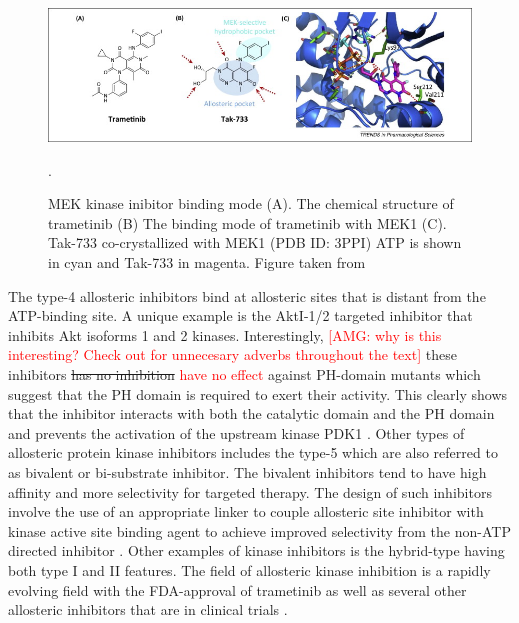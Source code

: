 \documentclass[a4paper, 11pt]{article}
\newcommand{\redcomment}[1]{\textcolor{red}{[#1]}} %
\newcommand{\redinsert}[1]{\textcolor{red}{#1}} %
\begin{document}
\begin{figure}[H]
	\includegraphics[width=\linewidth]{figures/trametinib.jpg}
	\centering
	\caption{MEK kinase inibitor binding mode (A). The chemical structure of trametinib (B) The binding mode of trametinib with MEK1 (C). Tak-733 co-crystallized with MEK1 (PDB ID: 3PPI) ATP is shown in cyan and Tak-733 in magenta. Figure taken from \cite{wu2015fda}}.
	\label{trametinib}
\end{figure}
The type-4 allosteric inhibitors bind at allosteric sites that is distant from the ATP-binding site. A unique example is the AktI-1/2 targeted inhibitor that inhibits Akt isoforms 1 and 2 kinases. Interestingly, \redcomment{AMG: why is this interesting? Check out for unnecesary adverbs throughout the text} 
 these inhibitors \sout{has no inhibition} \redinsert{have no effect} against PH-domain mutants which suggest that the PH domain is required to exert their activity. This clearly shows that the inhibitor interacts with both the catalytic domain and the PH domain and prevents the activation of the upstream kinase PDK1 \cite{barnett2005identification}. Other types of allosteric protein kinase inhibitors includes the type-5 which are also referred to as bivalent or bi-substrate inhibitor. The bivalent inhibitors tend to have high affinity and more selectivity for targeted therapy. The design of such inhibitors involve the use of an appropriate linker to couple allosteric site inhibitor with kinase active site binding agent to achieve improved selectivity from the non-ATP directed inhibitor \cite {lamba2012new}. Other examples of kinase inhibitors is the hybrid-type having both type I and II features. The field of allosteric kinase inhibition is a rapidly evolving field with the FDA-approval of trametinib as well as several other allosteric inhibitors that are in clinical trials \cite{wu2015allosteric}.
\end{document}
